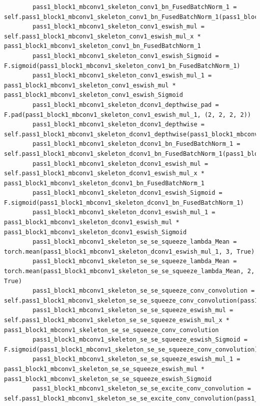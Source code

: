 \documentclass{fisatprojectfinal}
\begin{document}
\begin{appendices}
\begin{lstlisting}
        pass1_block1_mbconv1_skeleton_conv1_bn_FusedBatchNorm_1 = self.pass1_block1_mbconv1_skeleton_conv1_bn_FusedBatchNorm_1(pass1_block1_mbconv1_skeleton_conv1_convolution)
        pass1_block1_mbconv1_skeleton_conv1_eswish_mul = self.pass1_block1_mbconv1_skeleton_conv1_eswish_mul_x * pass1_block1_mbconv1_skeleton_conv1_bn_FusedBatchNorm_1
        pass1_block1_mbconv1_skeleton_conv1_eswish_Sigmoid = F.sigmoid(pass1_block1_mbconv1_skeleton_conv1_bn_FusedBatchNorm_1)
        pass1_block1_mbconv1_skeleton_conv1_eswish_mul_1 = pass1_block1_mbconv1_skeleton_conv1_eswish_mul * pass1_block1_mbconv1_skeleton_conv1_eswish_Sigmoid
        pass1_block1_mbconv1_skeleton_dconv1_depthwise_pad = F.pad(pass1_block1_mbconv1_skeleton_conv1_eswish_mul_1, (2, 2, 2, 2))
        pass1_block1_mbconv1_skeleton_dconv1_depthwise = self.pass1_block1_mbconv1_skeleton_dconv1_depthwise(pass1_block1_mbconv1_skeleton_dconv1_depthwise_pad)
        pass1_block1_mbconv1_skeleton_dconv1_bn_FusedBatchNorm_1 = self.pass1_block1_mbconv1_skeleton_dconv1_bn_FusedBatchNorm_1(pass1_block1_mbconv1_skeleton_dconv1_depthwise)
        pass1_block1_mbconv1_skeleton_dconv1_eswish_mul = self.pass1_block1_mbconv1_skeleton_dconv1_eswish_mul_x * pass1_block1_mbconv1_skeleton_dconv1_bn_FusedBatchNorm_1
        pass1_block1_mbconv1_skeleton_dconv1_eswish_Sigmoid = F.sigmoid(pass1_block1_mbconv1_skeleton_dconv1_bn_FusedBatchNorm_1)
        pass1_block1_mbconv1_skeleton_dconv1_eswish_mul_1 = pass1_block1_mbconv1_skeleton_dconv1_eswish_mul * pass1_block1_mbconv1_skeleton_dconv1_eswish_Sigmoid
        pass1_block1_mbconv1_skeleton_se_se_squeeze_lambda_Mean = torch.mean(pass1_block1_mbconv1_skeleton_dconv1_eswish_mul_1, 3, True)
        pass1_block1_mbconv1_skeleton_se_se_squeeze_lambda_Mean = torch.mean(pass1_block1_mbconv1_skeleton_se_se_squeeze_lambda_Mean, 2, True)
        pass1_block1_mbconv1_skeleton_se_se_squeeze_conv_convolution = self.pass1_block1_mbconv1_skeleton_se_se_squeeze_conv_convolution(pass1_block1_mbconv1_skeleton_se_se_squeeze_lambda_Mean)
        pass1_block1_mbconv1_skeleton_se_se_squeeze_eswish_mul = self.pass1_block1_mbconv1_skeleton_se_se_squeeze_eswish_mul_x * pass1_block1_mbconv1_skeleton_se_se_squeeze_conv_convolution
        pass1_block1_mbconv1_skeleton_se_se_squeeze_eswish_Sigmoid = F.sigmoid(pass1_block1_mbconv1_skeleton_se_se_squeeze_conv_convolution)
        pass1_block1_mbconv1_skeleton_se_se_squeeze_eswish_mul_1 = pass1_block1_mbconv1_skeleton_se_se_squeeze_eswish_mul * pass1_block1_mbconv1_skeleton_se_se_squeeze_eswish_Sigmoid
        pass1_block1_mbconv1_skeleton_se_se_excite_conv_convolution = self.pass1_block1_mbconv1_skeleton_se_se_excite_conv_convolution(pass1_block1_mbconv1_skeleton_se_se_squeeze_eswish_mul_1)

\end{lstlisting}
\end{appendices}
\end{document}

